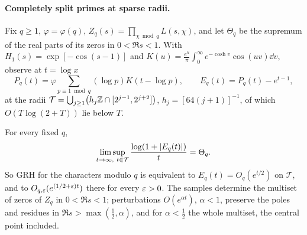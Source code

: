 \paragraph{Completely split primes at sparse radii.}
Fix $q\ge1$, $\varphi=\varphi(q)$, $Z_q(s)=\prod_{\chi\bmod q}L(s,\chi)$, and let $\Theta_q$ be the supremum of the real
parts of its zeros in $0<\Re s<1$. With $H_1(s)=\exp[-\cos(s-1)]$ and
$K(u)=\frac{e^u}\pi\int_0^\infty e^{-\cosh v}\cos(uv)\dd v$, observe at $t=\log x$
\[
 P_q(t)=\varphi\sum_{p\equiv1\bmod q}(\log p)K(t-\log p),\qquad E_q(t)=P_q(t)-e^{t-1},
\]
at the radii $\mathcal T=\bigcup_{j\ge1}\bigl(h_j\mathbb{Z}\cap[2^{j-1},2^{j+2}]\bigr)$, $h_j=[64(j+1)]^{-1}$, of which
$O(T\log(2+T))$ lie below $T$.

\begin{theorem}\label{rec:thm:mellin}
For every fixed $q$,
\[
 \limsup_{t\to\infty,\ t\in\mathcal T}\frac{\log(1+\lvert E_q(t)\rvert)}t=\Theta_q .
\]
So GRH for the characters modulo $q$ is equivalent to $E_q(t)=O_q(e^{t/2})$ on $\mathcal T$, and to
$O_{q,\varepsilon}(e^{(1/2+\varepsilon)t})$ there for every $\varepsilon>0$. The samples determine the multiset of zeros of $Z_q$ in
$0<\Re s<1$; perturbations $O(e^{\alpha t})$, $\alpha<1$, preserve the poles and residues in $\Re s>\max(\tfrac12,\alpha)$,
and for $\alpha<\tfrac12$ the whole multiset, the central point included.
\end{theorem}

